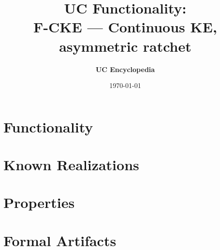 \documentclass[11pt,a4paper]{article}
\title{\textbf{\Large UC Functionality:}\\[0.2em] \Large F-CKE --- Continuous KE, asymmetric ratchet}
\author{\textbf{UC Encyclopedia}}
\date{\today}
\newtheorem{functionality}{Functionality}
\begin{document}
\maketitle

\begin{abstract}
\end{abstract}

\section{Functionality}

%

\section{Known Realizations}


\section{Properties}


\section{Formal Artifacts}

\end{document}
